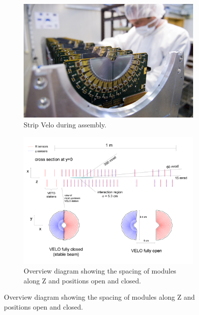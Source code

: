 \begin{figure}[H]
  \centering
\begin{subfigure}[t]{0.7\textwidth}
  \centering
  \includegraphics[width=\linewidth]{figures/chapter2/velo_assembly.jpg}
  \caption{Strip Velo during assembly\footnotemark. }
  \label{fig:velo_assembly}
  \end{subfigure}
\begin{subfigure}[t]{0.7\textwidth}
  \centering
  \includegraphics[width=\linewidth]{figures/chapter2/veloOverview.png}
  \caption[overview]{Overview diagram showing the spacing of modules along Z and positions open and closed.}
  \label{fig:velo_overview}
  \end{subfigure}
\end{figure}


